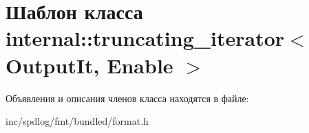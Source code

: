 \hypertarget{classinternal_1_1truncating__iterator}{}\section{Шаблон класса internal\+:\+:truncating\+\_\+iterator$<$ Output\+It, Enable $>$}
\label{classinternal_1_1truncating__iterator}


Объявления и описания членов класса находятся в файле\+:\begin{DoxyCompactItemize}
\item 
inc/spdlog/fmt/bundled/format.\+h\end{DoxyCompactItemize}
